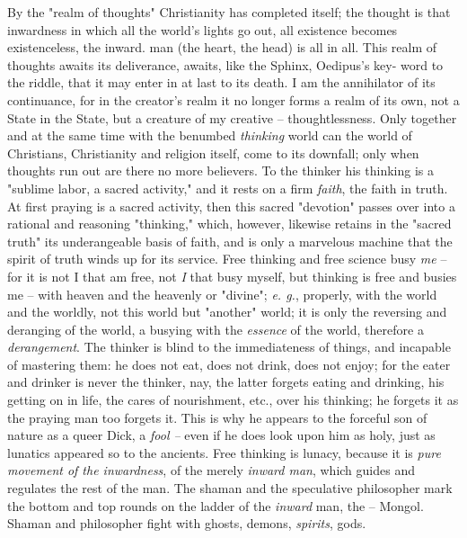 \documentclass[a4paper]{book}
\begin{document}
By the "{}realm of thoughts"{} Christianity has completed itself; the thought 
is that inwardness in which all the world's lights go out, all existence 
becomes existenceless, the inward. man (the heart, the head) is all in all. 
This realm of thoughts awaits its deliverance, awaits, like the Sphinx, 
Oedipus's key- word to the riddle, that it may enter in at last to its death. 
I am the annihilator of its continuance, for in the creator's realm it no 
longer forms a realm of its own, not a State in the State, but a creature of 
my creative -- thoughtlessness. Only together and at the same time with the 
benumbed \textit{thinking} world can the world of Christians, Christianity and 
religion itself, come to its downfall; only when thoughts run out are there no 
more believers. To the thinker his thinking is a "{}sublime labor, a sacred 
activity,"{} and it rests on a firm \textit{faith}, the faith in truth. At 
first praying is a sacred activity, then this sacred "{}devotion"{} passes 
over into a rational and reasoning "{}thinking,"{} which, however, likewise 
retains in the "{}sacred truth"{} its underangeable basis of faith, and is 
only a marvelous machine that the spirit of truth winds up for its service. 
Free thinking and free science busy \textit{me} -- for it is not I that am 
free, not \textit{I} that busy myself, but thinking is free and busies me -- 
with heaven and the heavenly or "{}divine"{}; \textit{e. g.}, properly, with 
the world and the worldly, not this world but "{}another"{} world; it is only 
the reversing and deranging of the world, a busying with the \textit{essence} 
of the world, therefore a \textit{derangement}. The thinker is blind to the 
immediateness of things, and incapable of mastering them: he does not eat, 
does not drink, does not enjoy; for the eater and drinker is never the 
thinker, nay, the latter forgets eating and drinking, his getting on in life, 
the cares of nourishment, etc., over his thinking; he forgets it as the 
praying man too forgets it. This is why he appears to the forceful son of 
nature as a queer Dick, a \textit{fool --} even if he does look upon him as 
holy, just as lunatics appeared so to the ancients. Free thinking is lunacy, 
because it is \textit{pure movement of the inwardness}, of the merely 
\textit{inward man}, which guides and regulates the rest of the man. The 
shaman and the speculative philosopher mark the bottom and top rounds on the 
ladder of the \textit{inward} man, the -- Mongol. Shaman and philosopher fight 
with ghosts, demons, \textit{spirits}, gods.
\end{document}
